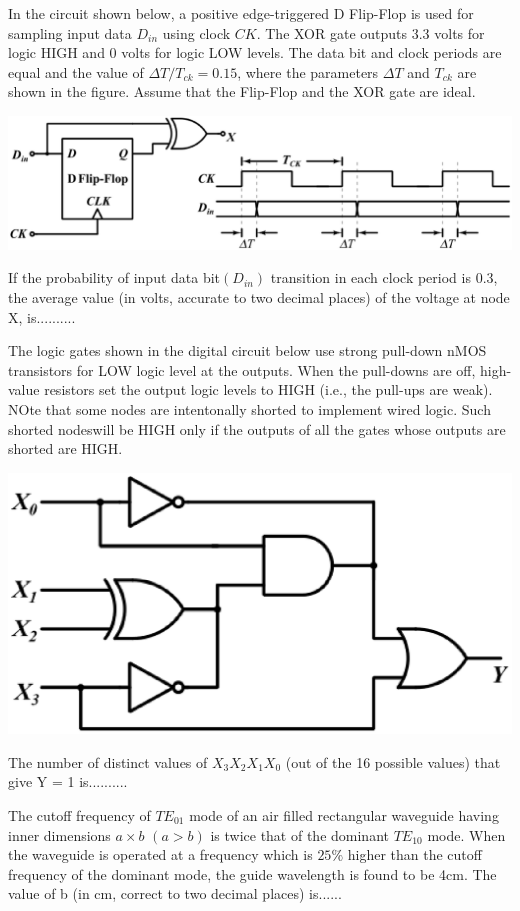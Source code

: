 \item In the circuit shown below, a positive edge-triggered D Flip-Flop is used for sampling input data $D_{in}$ using clock $CK$. The XOR gate outputs 3.3 volts for logic HIGH and 0 volts for logic LOW levels. The data bit and clock periods are equal and the value of $\Delta T/T_{ck} = 0.15$, where the parameters $\Delta T$ and $T_{ck}$ are shown in the figure. Assume that the Flip-Flop and the XOR gate are ideal.

\includegraphics[scale=0.23]{56}

If the probability of input data bit$(D_{in})$ transition in each clock period is 0.3, the average value (in volts, accurate to two decimal places) of the voltage at node X, is..........  

\item The logic gates shown in the digital circuit below use strong pull-down nMOS transistors for LOW logic level at the outputs. When the pull-downs are off, high-value resistors set the output logic levels to HIGH (i.e., the pull-ups are weak). NOte that some nodes are intentonally shorted to implement wired logic. Such shorted nodeswill be HIGH only if the outputs of all the gates whose outputs are shorted are HIGH.

\includegraphics[scale=0.4]{57}

The number of distinct values of $X_3 X_2 X_1 X_0$ (out of the 16 possible values) that give Y = 1 is..........

\item The cutoff frequency of $TE_{01}$ mode of an air filled rectangular waveguide having inner dimensions $a \times b$ $(a > b)$ is twice that of the dominant $TE_{10}$ mode. When the waveguide is operated at a frequency which is $25\%$ higher than the cutoff frequency of the dominant mode, the guide wavelength is found to be 4cm. The value of b (in cm, correct to two decimal places) is......

